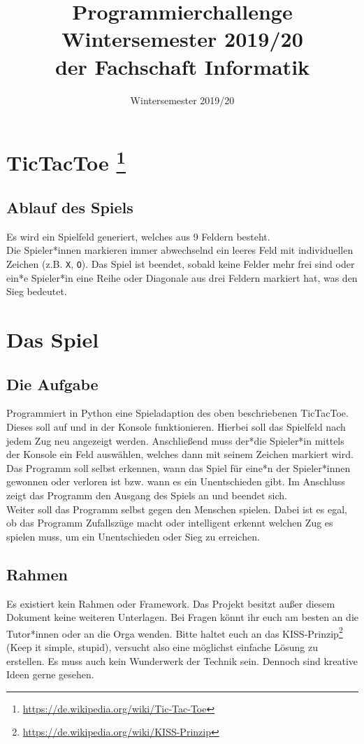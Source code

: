 \documentclass[accentcolor=3c,colorbacktitle,12pt]{tudaexercise}
\begin{document}
\title{Programmierchallenge Wintersemester 2019/20 \\ {\small der Fachschaft Informatik}}
\subtitle{Wintersemester 2019/20}
\maketitle 
	
	\section*{TicTacToe \footnote[1]{\url{https://de.wikipedia.org/wiki/Tic-Tac-Toe}}}
	\subsection*{Ablauf des Spiels}
	Es wird ein Spielfeld generiert, welches aus 9 Feldern besteht. \\
	
	Die Spieler*innen markieren immer abwechselnd ein leeres Feld mit individuellen Zeichen (z.B. \texttt{X}, \texttt{O}). Das Spiel ist beendet, sobald keine Felder mehr frei sind oder ein*e Spieler*in eine Reihe oder Diagonale aus drei Feldern markiert hat, was den Sieg bedeutet. \\
	
	
	\section*{Das Spiel}
	\subsection*{Die Aufgabe}
	Programmiert in Python eine Spieladaption des oben beschriebenen TicTacToe. Dieses soll auf und in der Konsole funktionieren. Hierbei soll das Spielfeld nach jedem Zug neu angezeigt werden. Anschließend muss der*die Spieler*in mittels der Konsole ein Feld auswählen, welches dann mit seinem Zeichen markiert wird. \\
	Das Programm soll selbst erkennen, wann das Spiel für eine*n der Spieler*innen gewonnen oder verloren ist bzw. wann es ein Unentschieden gibt. Im Anschluss zeigt das Programm den Ausgang des Spiels an und beendet sich. \\
	Weiter soll das Programm selbst gegen den Menschen spielen. Dabei ist es egal, ob das Programm Zufallszüge macht oder intelligent erkennt welchen Zug es spielen muss, um ein Unentschieden oder Sieg zu erreichen.  
	
	\subsection*{Rahmen}
	Es existiert kein Rahmen oder Framework. Das Projekt besitzt außer diesem Dokument keine weiteren Unterlagen. Bei Fragen könnt ihr euch am besten an die Tutor*innen oder an die Orga wenden. Bitte haltet euch an das KISS-Prinzip\footnote[2]{\url{https://de.wikipedia.org/wiki/KISS-Prinzip}} (Keep it simple, stupid), versucht also eine möglichst einfache Lösung zu erstellen. Es muss auch kein Wunderwerk der Technik sein. Dennoch sind kreative Ideen gerne gesehen.
	
\end{document}
